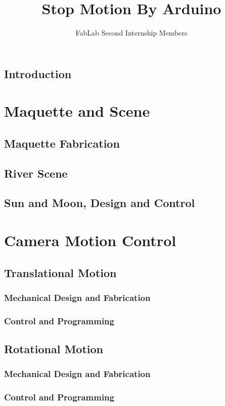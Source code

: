 \documentclass[]{report}
\title{Stop Motion By Arduino}
\author{FabLab Second Internship Members}
\begin{document}
\maketitle


\begin{abstract}
\end{abstract}

\tableofcontents

\chapter{Introduction}

\part{Maquette and Scene}

	\chapter{Maquette Fabrication}
	
	\chapter{River Scene}
	
	\chapter{Sun and Moon, Design and Control}

\part{Camera Motion Control}
	
	\chapter{Translational Motion}
		\section{Mechanical Design and Fabrication}
		\section{Control and Programming}
		
	\chapter{Rotational Motion}
		\section{Mechanical Design and Fabrication}
		\section{Control and Programming}
		
\end{document}
